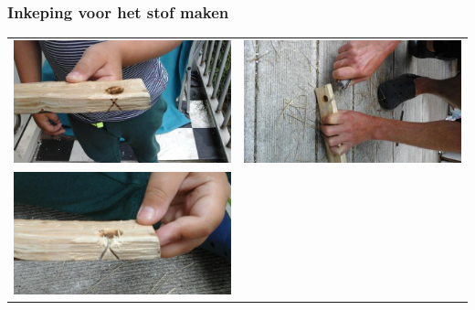\documentclass[a4paper, handout]{beamer}
\begin{document}
\begin{frame}
\begin{tabular}{ c c }
		\\
	\end{tabular}
\end{frame}

\begin{frame}
	\frametitle{Inkeping voor het stof maken}
	\begin{tabular}{ c c }
		\includegraphics[scale=0.15]{inkeping-1}
		&
		\includegraphics[scale=0.15]{inkeping-2}
		\\
		\includegraphics[scale=0.15]{inkeping-3}

\end{tabular}
\end{frame}
\end{document}
